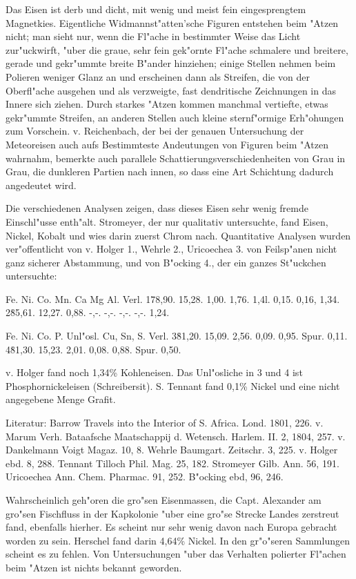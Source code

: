 \documentclass[a4paper, 11pt, oneside]{article}
\begin{document}
Das Eisen ist derb und dicht, mit wenig und meist fein eingesprengtem Magnetkies. Eigentliche Widmannst"atten'sche Figuren entstehen beim "Atzen nicht; man sieht nur, wenn die Fl"ache in bestimmter Weise das Licht zur"uckwirft, "uber die graue, sehr fein gek"ornte Fl"ache schmalere und breitere, gerade und gekr"ummte breite B"ander hinziehen; einige Stellen nehmen beim Polieren weniger Glanz an und erscheinen dann als Streifen, die von der Oberfl"ache ausgehen und als verzweigte, fast dendritische Zeichnungen in das Innere sich ziehen. Durch starkes "Atzen kommen manchmal vertiefte, etwas gekr"ummte Streifen, an anderen Stellen auch kleine sternf"ormige Erh"ohungen zum Vorschein. v. Reichenbach, der bei der genauen Untersuchung der Meteoreisen auch aufs Bestimmteste Andeutungen von Figuren beim "Atzen wahrnahm, bemerkte auch parallele Schattierungsverschiedenheiten von Grau in Grau, die dunkleren Partien nach innen, so dass eine Art Schichtung dadurch angedeutet wird.

Die verschiedenen Analysen zeigen, dass dieses Eisen sehr wenig fremde Einschl"usse enth"alt. Stromeyer, der nur qualitativ untersuchte, fand Eisen, Nickel, Kobalt und wies darin zuerst Chrom nach. Quantitative Analysen wurden ver"offentlicht von v. Holger 1., Wehrle 2., Uricoechea 3. von Feilsp"anen nicht ganz sicherer Abstammung, und von B"ocking 4., der ein ganzes St"uckchen untersuchte:

Fe. Ni. Co. Mn. Ca Mg Al. Verl.  
1\. 78,90. 15,28. 1,00. 1,76. 1,4l. 0,15. 0,16, 1,34.  
2\. 85,61. 12,27. 0,88. -,-. -,-. -,-. -,-. 1,24.

Fe. Ni. Co. P. Unl"osl. Cu, Sn, S. Verl.  
3\. 81,20. 15,09. 2,56. 0,09. 0,95. Spur. 0,11.  
4\. 81,30. 15,23. 2,01. 0,08. 0,88. Spur. 0,50.

v. Holger fand noch 1,34\% Kohleneisen. Das Unl"osliche in 3 und 4 ist Phosphornickeleisen (Schreibersit). S. Tennant fand 0,1\% Nickel und eine nicht angegebene Menge Grafit.

Literatur: Barrow Travels into the Interior of S. Africa. Lond. 1801, 226. v. Marum Verh. Bataafsche Maatschappij d. Wetensch. Harlem. II. 2, 1804, 257. v. Dankelmann Voigt Magaz. 10, 8. Wehrle Baumgart. Zeitschr. 3, 225. v. Holger ebd. 8, 288. Tennant Tilloch Phil. Mag. 25, 182. Stromeyer Gilb. Ann. 56, 191. Uricoechea Ann. Chem. Pharmac. 91, 252. B"ocking ebd, 96, 246.

Wahrscheinlich geh"oren die gro"sen Eisenmassen, die Capt. Alexander am gro"sen Fischfluss in der Kapkolonie "uber eine gro"se Strecke Landes zerstreut fand, ebenfalls hierher. Es scheint nur sehr wenig davon nach Europa gebracht worden zu sein. Herschel fand darin 4,64\% Nickel. In den gr"o"seren Sammlungen scheint es zu fehlen. Von Untersuchungen "uber das Verhalten polierter Fl"achen beim "Atzen ist nichts bekannt geworden.
\end{document}
